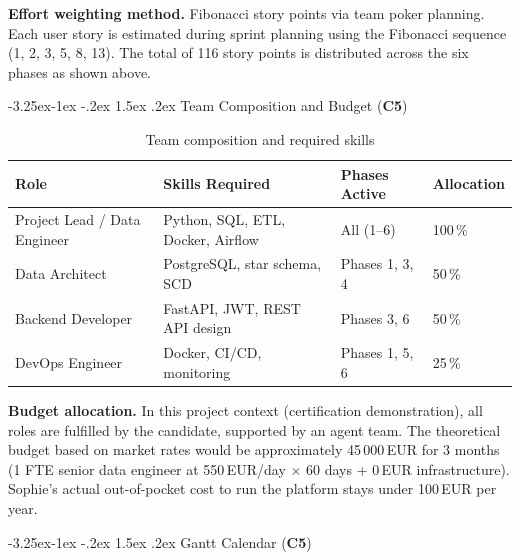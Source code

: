 \documentclass[a4paper,11pt,oneside,openany]{report}
\makeatletter
\renewcommand\subsection{\@startsection{subsection}{2}{\z@}%
  {-3.25ex\@plus -1ex \@minus -.2ex}%
  {1.5ex \@plus .2ex}%
  {\normalfont\large\bfseries\color{ntdarkgreen}}}
\newcommand{\competence}[1]{\textbf{\textcolor{ntgreen}{#1}}}
\makeatother
\begin{document}
\textbf{Effort weighting method.} Fibonacci story points via team
poker planning. Each user story is estimated during sprint
planning using the Fibonacci sequence (1, 2, 3, 5, 8, 13). The
total of 116 story points is distributed across the six phases as
shown above.

\subsection{Team Composition and Budget (\competence{C5})}

\begin{table}[H]
\centering
\caption{Team composition and required skills}
\label{tab:team}
\begin{tabularx}{\textwidth}{L{3cm} L{3.5cm} L{3cm} C{2cm}}
\toprule
\textbf{Role} & \textbf{Skills Required} & \textbf{Phases Active} & \textbf{Allocation} \\
\midrule
Project Lead / Data Engineer & Python, SQL, ETL, Docker, Airflow & All (1--6) & 100\,\% \\
Data Architect & PostgreSQL, star schema, SCD & Phases 1, 3, 4 & 50\,\% \\
Backend Developer & FastAPI, JWT, REST API design & Phases 3, 6 & 50\,\% \\
DevOps Engineer & Docker, CI/CD, monitoring & Phases 1, 5, 6 & 25\,\% \\
\bottomrule
\end{tabularx}
\end{table}

\textbf{Budget allocation.} In this project context
(certification demonstration), all roles are fulfilled by the
candidate, supported by an agent team. The theoretical budget
based on market rates would be approximately 45\,000\,EUR for
3 months (1 FTE senior data engineer at 550\,EUR/day $\times$
60 days + 0\,EUR infrastructure). Sophie's actual out-of-pocket
cost to run the platform stays under 100\,EUR per year.

\subsection{Gantt Calendar (\competence{C5})}
\end{document}
